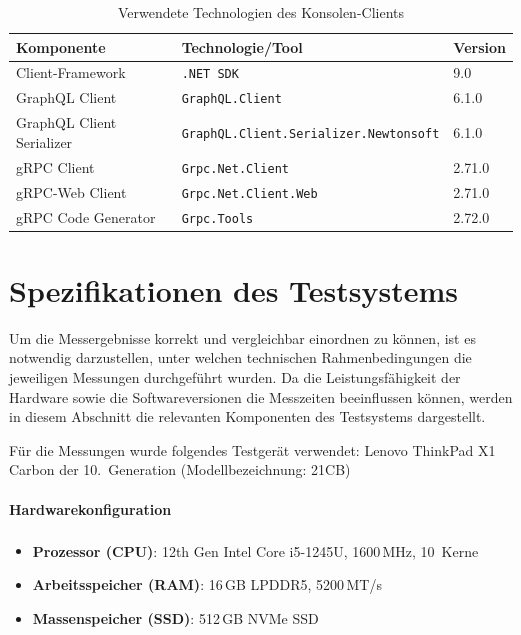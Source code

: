 \begin{enumerate}
	\begin{table}[h]
		\centering
		\caption{Verwendete Technologien des Konsolen-Clients}
		\begin{tabular}{lll}
			\hline
			\textbf{Komponente} & \textbf{Technologie/Tool} & \textbf{Version} \\
			\hline
			Client-Framework & \texttt{.NET~SDK} & 9.0 \\
			GraphQL Client & \texttt{GraphQL.Client} & 6.1.0 \\
			GraphQL Client Serializer & \texttt{GraphQL.Client.Serializer.Newtonsoft} & 6.1.0 \\
			gRPC Client & \texttt{Grpc.Net.Client} & 2.71.0 \\
			gRPC-Web Client & \texttt{Grpc.Net.Client.Web} & 2.71.0 \\
			gRPC Code Generator & \texttt{Grpc.Tools} & 2.72.0 \\
			\hline
		\end{tabular}
	\end{table}
	
\end{enumerate}

\clearpage
\section{Spezifikationen des Testsystems}
Um die Messergebnisse korrekt und vergleichbar einordnen zu können, ist es notwendig darzustellen, unter welchen technischen Rahmenbedingungen die jeweiligen Messungen durchgeführt wurden. Da die Leistungsfähigkeit der Hardware sowie die Softwareversionen die Messzeiten beeinflussen können, werden in diesem Abschnitt die relevanten Komponenten des Testsystems dargestellt.

Für die Messungen wurde folgendes Testgerät verwendet:  
Lenovo ThinkPad X1 Carbon der 10.\ Generation (Modellbezeichnung: 21CB)

\paragraph{Hardwarekonfiguration}
\begin{itemize}
	\item \textbf{Prozessor (CPU)}: 12th Gen Intel\textsuperscript{\textregistered} Core\texttrademark{} i5-1245U, 1600\,MHz, 10~Kerne
	\item \textbf{Arbeitsspeicher (RAM)}: 16\,GB LPDDR5, 5200\,MT/s
	\item \textbf{Massenspeicher (SSD)}: 512\,GB NVMe SSD
\end{itemize}

